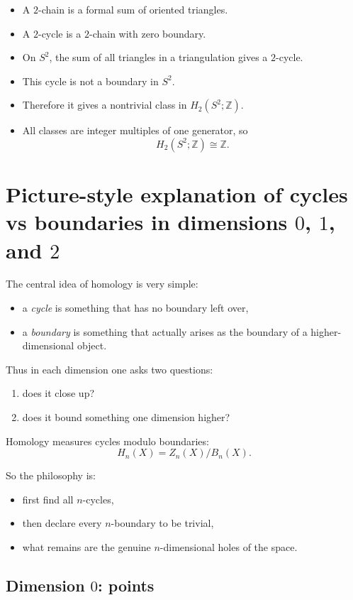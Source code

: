 \documentclass[12pt,a4paper]{article}
\newcommand{\Z}{\mathbb{Z}}
\theoremstyle{notespace}
\begin{document}
\begin{itemize}
	\item A \(2\)-chain is a formal sum of oriented triangles.
	\item A \(2\)-cycle is a \(2\)-chain with zero boundary.
	\item On \(S^2\), the sum of all triangles in a triangulation gives a \(2\)-cycle.
	\item This cycle is not a boundary in \(S^2\).
	\item Therefore it gives a nontrivial class in \(H_2(S^2;\Z)\).
	\item All classes are integer multiples of one generator, so
	\[
	H_2(S^2;\Z)\cong \Z.
	\]
\end{itemize}

\section{Picture-style explanation of cycles vs boundaries in dimensions \(0\), \(1\), and \(2\)}

The central idea of homology is very simple:

\begin{itemize}
	\item a \emph{cycle} is something that has no boundary left over,
	\item a \emph{boundary} is something that actually arises as the boundary of a higher-dimensional object.
\end{itemize}

Thus in each dimension one asks two questions:
\begin{enumerate}
	\item does it close up?
	\item does it bound something one dimension higher?
\end{enumerate}

Homology measures cycles modulo boundaries:
\[
H_n(X)=Z_n(X)/B_n(X).
\]

So the philosophy is:
\begin{itemize}
	\item first find all \(n\)-cycles,
	\item then declare every \(n\)-boundary to be trivial,
	\item what remains are the genuine \(n\)-dimensional holes of the space.
\end{itemize}

\subsection{Dimension \(0\): points}
\end{document}
